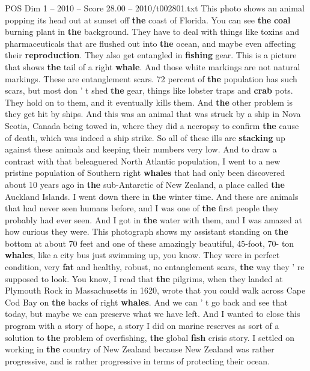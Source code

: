 \begin{textsample}{POS Dim 1 – 2010 – Score 28.00 – 2010/t002801.txt}
This photo shows an animal popping its head out at sunset off \textbf{the} coast of Florida.
You can see \textbf{the} \textbf{coal} burning plant in \textbf{the} background.
They have to deal with things like toxins and pharmaceuticals that are flushed out into \textbf{the} ocean, and maybe even affecting their \textbf{reproduction}.
They also get entangled in \textbf{fishing} gear.
This is a picture that shows \textbf{the} tail of a right \textbf{whale}.
And those white markings are not natural markings.
These are entanglement scars. 72 percent of \textbf{the} population has such scars, but most don ' t shed \textbf{the} gear, things like lobster traps and \textbf{crab} pots.
They hold on to them, and it eventually kills them.
And \textbf{the} other problem is they get hit by ships.
And this was an animal that was struck by a ship in Nova Scotia, Canada being towed in, where they did a necropsy to confirm \textbf{the} cause of death, which was indeed a ship strike.
So all of these ills are \textbf{stacking} up against these animals and keeping their numbers very low.
And to draw a contrast with that beleaguered North Atlantic population, I went to a new pristine population of Southern right \textbf{whales} that had only been discovered about 10 years ago in \textbf{the} sub-Antarctic of New Zealand, a place called \textbf{the} Auckland Islands.
I went down there in \textbf{the} winter time.
And these are animals that had never seen humans before, and I was one of \textbf{the} first people they probably had ever seen.
And I got in \textbf{the} water with them, and I was amazed at how curious they were.
This photograph shows my assistant standing on \textbf{the} bottom at about 70 feet and one of these amazingly beautiful, 45-foot, 70- ton \textbf{whales}, like a city bus just swimming up, you know.
They were in perfect condition, very \textbf{fat} and healthy, robust, no entanglement scars, \textbf{the} way they ' re supposed to look.
You know, I read that \textbf{the} pilgrims, when they landed at Plymouth Rock in Massachusetts in 1620, wrote that you could walk across Cape Cod Bay on \textbf{the} backs of right \textbf{whales}.
And we can ' t go back and see that today, but maybe we can preserve what we have left.
And I wanted to close this program with a story of hope, a story I did on marine reserves as sort of a solution to \textbf{the} problem of overfishing, \textbf{the} global \textbf{fish} crisis story.
I settled on working in \textbf{the} country of New Zealand because New Zealand was rather progressive, and is rather progressive in terms of protecting their ocean.

\end{textsample}
